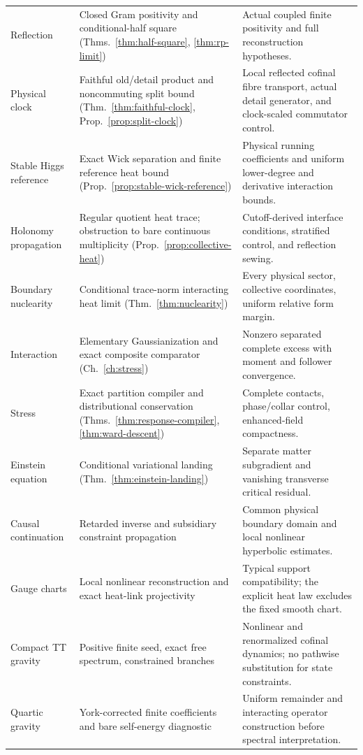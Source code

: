\documentclass[11pt,a4paper,oneside]{book}
\theoremstyle{plain}
\theoremstyle{definition}
\theoremstyle{remark}
\begin{document}
\begin{longtable}{@{}>{\raggedright\arraybackslash}p{}>{\raggedright\arraybackslash}p{}>{\raggedright\arraybackslash}p{}@{}}
Reflection & Closed Gram positivity and conditional-half square (Thms.~\ref{thm:half-square}, \ref{thm:rp-limit}) & Actual coupled finite positivity and full reconstruction hypotheses.\\[1pt]
Physical clock & Faithful old/detail product and noncommuting split bound (Thm.~\ref{thm:faithful-clock}, Prop.~\ref{prop:split-clock}) & Local reflected cofinal fibre transport, actual detail generator, and clock-scaled commutator control.\\[1pt]
Stable Higgs reference & Exact Wick separation and finite reference heat bound (Prop.~\ref{prop:stable-wick-reference}) & Physical running coefficients and uniform lower-degree and derivative interaction bounds.\\[1pt]
Holonomy propagation & Regular quotient heat trace; obstruction to bare continuous multiplicity (Prop.~\ref{prop:collective-heat}) & Cutoff-derived interface conditions, stratified control, and reflection sewing.\\[1pt]
Boundary nuclearity & Conditional trace-norm interacting heat limit (Thm.~\ref{thm:nuclearity}) & Every physical sector, collective coordinates, uniform relative form margin.\\[1pt]
Interaction & Elementary Gaussianization and exact composite comparator (Ch.~\ref{ch:stress}) & Nonzero separated complete excess with moment and follower convergence.\\[1pt]
Stress & Exact partition compiler and distributional conservation (Thms.~\ref{thm:response-compiler}, \ref{thm:ward-descent}) & Complete contacts, phase/collar control, enhanced-field compactness.\\[1pt]
Einstein equation & Conditional variational landing (Thm.~\ref{thm:einstein-landing}) & Separate matter subgradient and vanishing transverse critical residual.\\[1pt]
Causal continuation & Retarded inverse and subsidiary constraint propagation & Common physical boundary domain and local nonlinear hyperbolic estimates.\\[1pt]
Gauge charts & Local nonlinear reconstruction and exact heat-link projectivity & Typical support compatibility; the explicit heat law excludes the fixed smooth chart.\\[1pt]
Compact TT gravity & Positive finite seed, exact free spectrum, constrained branches & Nonlinear and renormalized cofinal dynamics; no pathwise substitution for state constraints.\\[1pt]
Quartic gravity & York-corrected finite coefficients and bare self-energy diagnostic & Uniform remainder and interacting operator construction before spectral interpretation.\\[1pt]

\end{longtable}
\end{document}
